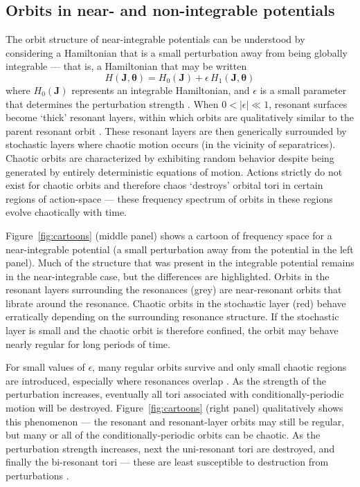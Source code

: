 \documentclass[letterpaper,12pt,preprint]{aastex}
\newcommand{\bs}[1]{\boldsymbol{#1}}
\begin{document}
\subsection{Orbits in near- and non-integrable potentials}

The orbit structure of near-integrable potentials can be understood by considering a Hamiltonian that is a small perturbation away from being globally integrable --- that is, a Hamiltonian that may be written
\begin{equation}
	H(\boldsymbol{J}, \boldsymbol{\theta}) = H_0(\boldsymbol{J}) + \epsilon \, H_1(\boldsymbol{J}, \boldsymbol{\theta})
\end{equation}
where $H_0(\bs{J})$ represents an integrable Hamiltonian, and $\epsilon$ is a small parameter that determines the perturbation strength \citep[a description of perturbation theory applied to nonlinear Hamiltonians is given in][]{lichtenberg83}. When $0 < |\epsilon| \ll 1$, resonant surfaces become `thick' resonant layers, within which orbits are qualitatively similar to the parent resonant orbit \citep[e.g.,][]{merritt99}. These resonant layers are then generically surrounded by stochastic layers where chaotic motion occurs (in the vicinity of separatrices). Chaotic orbits are characterized by exhibiting random behavior despite being generated by entirely deterministic equations of motion. Actions strictly do not exist for chaotic orbits and therefore chaos `destroys' orbital tori in certain regions of action-space --- these frequency spectrum of orbits in these regions evolve chaotically with time. 

Figure~\ref{fig:cartoons} (middle panel) shows a cartoon of frequency space for a near-integrable potential (a small perturbation away from the potential in the left panel). Much of the structure that was present in the integrable potential remains in the near-integrable case, but the differences are highlighted. Orbits in the resonant layers surrounding the resonances (grey) are near-resonant orbits that librate around the resonance. Chaotic orbits in the stochastic layer (red) behave erratically depending on the surrounding resonance structure. If the stochastic layer is small and the chaotic orbit is therefore confined, the orbit may behave nearly regular for long periods of time.

For small values of $\epsilon$, many regular orbits survive and only small chaotic regions are introduced, especially where resonances overlap \citep[see][]{chirikov60}. As the strength of the perturbation increases, eventually all tori associated with conditionally-periodic motion will be destroyed. Figure~\ref{fig:cartoons} (right panel) qualitatively shows this phenomenon --- the resonant and resonant-layer orbits may still be regular, but many or all of the conditionally-periodic orbits can be chaotic. As the perturbation strength increases, next the uni-resonant tori are destroyed, and finally the bi-resonant tori --- these are least susceptible to destruction from perturbations \cite[for a more quantitative illustration of this transition from integrability to global chaos, see Figure~9 in][]{valluri98}.
\end{document}
